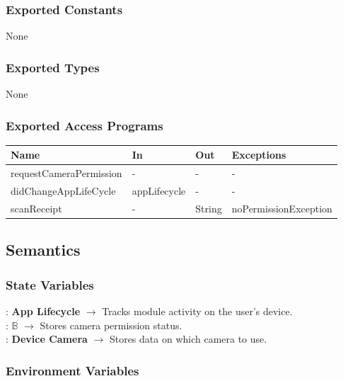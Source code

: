 \documentclass[12pt, titlepage]{article}
\begin{document}
\subsubsection{Exported Constants}

None

\subsubsection{Exported Types}

None

\subsubsection{Exported Access Programs}

\begin{center}
  \begin{tabular}{p{5cm} p{4cm} p{3cm} p{4cm}}
  \hline
  \textbf{Name} & \textbf{In} & \textbf{Out} & \textbf{Exceptions} \\
  \hline
  requestCameraPermission & - & - & - \\
  didChangeAppLifeCycle & appLifecycle & - & - \\
  scanReceipt & - & String & noPermissionException \\
  \hline
  \end{tabular}
\end{center}

\subsection{Semantics}

\subsubsection{State Variables}

 : \textbf{App Lifecycle} $\rightarrow$ Tracks module activity on the user's device. \\
 : \textbf{$\mathbb{B}$} $\rightarrow$ Stores camera permission status. \\
 : \textbf{Device Camera} $\rightarrow$ Stores data on which camera to use.

\subsubsection{Environment Variables}
\end{document}
